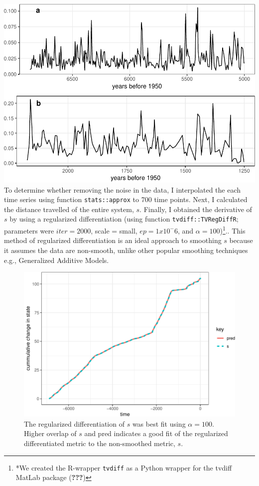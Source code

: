 \documentclass[12pt,twoside,openany]{reedthesis}
\begin{document}
\includegraphics{_myDissertation_files/figure-latex/paleoRegime1and3-1.pdf}
To determine whether removing the noise in the data, I interpolated the
each time series using function \texttt{stats::approx} to 700 time
points. Next, I calculated the distance travelled of the entire system,
\(s\). Finally, I obtained the derivative of \(s\) by using a
regularized differentiation (using function \texttt{tvdiff::TVRegDiffR};
parameters were \(iter = 2000\), scale = small, \(ep = 1 x 10^-6\), and
\(\alpha = 100\))\footnote{*We created the R-wrapper \texttt{tvdiff} as
  a Python wrapper for the tvdiff MatLab package ({\textbf{???}})}..
This method of regularized differentiation is an ideal approach to
smoothing \(s\) because it assumes the data are non-smooth, unlike other
popular smoothing techniques e.g., Generalized Additive Models.
\begin{figure}
\centering
\includegraphics{_myDissertation_files/figure-latex/paleoObsPred-1.pdf}
\caption{\label{fig:paleoObsPred}The regularized differentiation of \(s\)
was best fit using \(\alpha = 100\). Higher overlap of \(s\) and pred
indicates a good fit of the regularized differentiated metric to the
non-smoothed metric, \(s\).}
\end{figure}
\end{document}
